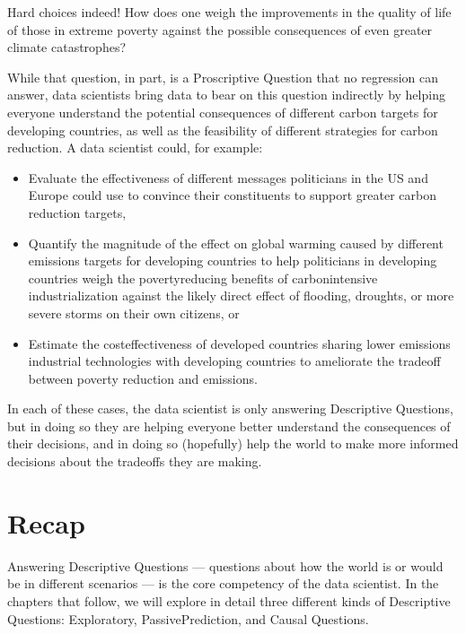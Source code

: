 \documentclass[letterpaper,10pt,english]{jupyterBook}
\begin{document}
\sphinxAtStartPar
Hard choices indeed! How does one weigh the improvements in the quality of life of those in extreme poverty against the possible consequences of even greater climate catastrophes?

\sphinxAtStartPar
While that question, in part, is a Proscriptive Question that no regression can answer, data scientists  bring data to bear on this question indirectly by helping everyone understand the potential consequences of different carbon targets for developing countries, as well as the feasibility of different strategies for carbon reduction. A data scientist could, for example:
\begin{itemize}
\item {} 
\sphinxAtStartPar
Evaluate the effectiveness of different messages politicians in the US and Europe could use to convince their constituents to support greater carbon reduction targets,

\item {} 
\sphinxAtStartPar
Quantify the magnitude of the effect on global warming caused by different emissions targets for developing countries to help politicians in developing countries weigh the poverty\sphinxhyphen{}reducing benefits of carbon\sphinxhyphen{}intensive industrialization against the likely direct effect of flooding, droughts, or more severe storms on their own citizens, or

\item {} 
\sphinxAtStartPar
Estimate the cost\sphinxhyphen{}effectiveness of developed countries sharing lower emissions industrial technologies with developing countries to ameliorate the tradeoff between poverty reduction and emissions.

\end{itemize}

\sphinxAtStartPar
In each of these cases, the data scientist is only answering Descriptive Questions, but in doing so they are helping everyone better understand the consequences of their decisions, and in doing so (hopefully) help the world to make more informed decisions about the trade\sphinxhyphen{}offs they are making.


\section{Recap}
\label{\detokenize{30_questions/05_descriptive_v_proscriptive:recap}}
\sphinxAtStartPar
Answering Descriptive Questions — questions about how the world is or would be in different scenarios — is the core competency of the data scientist. In the chapters that follow, we will explore in detail three different kinds of Descriptive Questions: Exploratory, Passive\sphinxhyphen{}Prediction, and Causal Questions.
\end{document}
